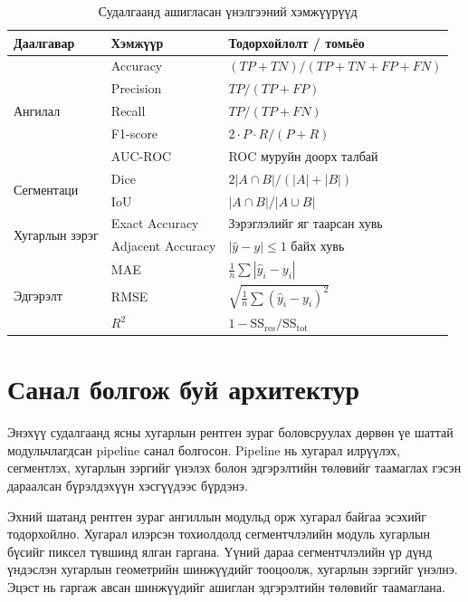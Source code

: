 \begin{table}[!htbp]
\centering
\small
\begin{tabular}{l l l}
\toprule
\textbf{Даалгавар} & \textbf{Хэмжүүр} & \textbf{Тодорхойлолт / томьёо} \\
\midrule
\multirow{5}{*}{Ангилал}
  & Accuracy  & $(TP+TN)/(TP+TN+FP+FN)$ \\[2pt]
  & Precision & $TP/(TP+FP)$ \\[2pt]
  & Recall    & $TP/(TP+FN)$ \\[2pt]
  & F1-score  & $2\cdot P\cdot R/(P+R)$ \\[2pt]
  & AUC-ROC   & ROC муруйн доорх талбай \\[4pt]
\multirow{2}{*}{Сегментаци}
  & Dice & $2|A\cap B| / (|A|+|B|)$ \\[2pt]
  & IoU  & $|A\cap B| / |A\cup B|$ \\[4pt]
\multirow{2}{*}{Хугарлын зэрэг}
  & Exact Accuracy    & Зэрэглэлийг яг таарсан хувь \\[2pt]
  & Adjacent Accuracy & $|\hat{y}-y|\leq 1$ байх хувь \\[4pt]
\multirow{3}{*}{Эдгэрэлт}
  & MAE  & $\frac{1}{n}\sum|\hat{y}_i-y_i|$ \\[2pt]
  & RMSE & $\sqrt{\frac{1}{n}\sum(\hat{y}_i-y_i)^2}$ \\[2pt]
  & $R^2$ & $1-\mathrm{SS_{res}}/\mathrm{SS_{tot}}$ \\
\bottomrule
\end{tabular}
\caption{Судалгаанд ашигласан үнэлгээний хэмжүүрүүд}
\label{tab:metrics}
\end{table}

\section{Санал болгож буй архитектур}

Энэхүү судалгаанд ясны хугарлын рентген зураг боловсруулах дөрвөн үе шаттай модульчлагдсан pipeline санал болгосон. Pipeline нь хугарал илрүүлэх, сегментлэх, хугарлын зэргийг үнэлэх болон эдгэрэлтийн төлөвийг таамаглах гэсэн дараалсан бүрэлдэхүүн хэсгүүдээс бүрдэнэ.

Эхний шатанд рентген зураг ангиллын модульд орж хугарал байгаа эсэхийг тодорхойлно. Хугарал илэрсэн тохиолдолд сегментчлэлийн модуль хугарлын бүсийг пиксел түвшинд ялган гаргана. Үүний дараа сегментчлэлийн үр дүнд үндэслэн хугарлын геометрийн шинжүүдийг тооцоолж, хугарлын зэргийг үнэлнэ. Эцэст нь гаргаж авсан шинжүүдийг ашиглан эдгэрэлтийн төлөвийг таамаглана.

